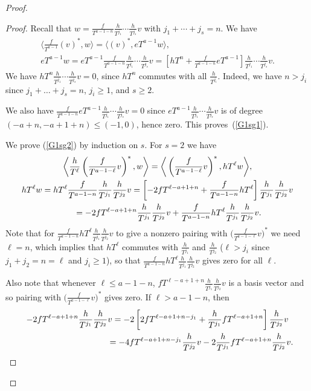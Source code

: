 \begin{proof}
\begin{proof}Recall that $w=\frac{f}{T^{a-1-n}}\frac{h}{T^{j_1}} \cdots \frac{h}{T^{j_s}} v$ with $j_1+\cdots+j_s=n$. We have
\begin{gather*}
\bigg\langle \frac{f}{T^{a-1}} (v)^*, w \bigg\rangle = \big\langle (v)^*, eT^{a-1} w \big\rangle, \\
eT^{a-1} w = eT^{a-1} \frac{f}{T^{a-1-n}}\frac{h}{T^{j_1}} \cdots \frac{h}{T^{j_s}} v = \left[ hT^n + \frac{f}{T^{a-1-n}} eT^{a-1} \right] \frac{h}{T^{j_1}} \cdots \frac{h}{T^{j_s}} v.
\end{gather*}
We have $hT^n \frac{h}{T^{j_1}} \cdots \frac{h}{T^{j_s}} v=0$, since $hT^n$ commutes with all $\frac{h}{T^{j_i}}$. Indeed, we have $n > j_i$ since $j_1 + \dots + j_s = n$, $j_i \geq 1$, and $s \geq 2$.

We also have $\frac{f}{T^{a-1-n}} eT^{a-1} \frac{h}{T^{j_1}} \cdots \frac{h}{T^{j_s}} v=0$ since $eT^{a-1} \frac{h}{T^{j_1}} \cdots \frac{h}{T^{j_s}}v$ is of degree $(-a+n, -a+1+n) \leq (-1, 0)$, hence zero. This proves~(\ref{G1sg1}).

We prove (\ref{G1sg2}) by induction on $s$. For $s=2$ we have
\begin{gather*}
\bigg\langle \frac{h}{T^{\ell}} \left(\frac{f}{T^{a-1-\ell}}v\right)^*, w \bigg\rangle = \bigg\langle \left(\frac{f}{T^{a-1-\ell}}v\right)^*, hT^{\ell} w \bigg\rangle, \\
hT^{\ell} w = hT^{\ell} \frac{f}{T^{a-1-n}}\frac{h}{T^{j_1}} \frac{h}{T^{j_2}} v = \left[ -2 fT^{\ell-a+1+n} + \frac{f}{T^{a-1-n}} hT^{\ell} \right] \frac{h}{T^{j_1}} \frac{h}{T^{j_2}} v \\
\hphantom{hT^{\ell} w}{} = -2 fT^{\ell-a+1+n} \frac{h}{T^{j_1}} \frac{h}{T^{j_2}} v + \frac{f}{T^{a-1-n}} hT^{\ell} \frac{h}{T^{j_1}} \frac{h}{T^{j_2}} v.
\end{gather*}
Note that for $ \frac{f}{T^{a-1-n}} hT^{\ell} \frac{h}{T^{j_1}} \frac{h}{T^{j_2}} v $ to give a nonzero pairing with $\big(\frac{f}{T^{a-1-\ell}}v\big)^*$ we need $\ell=n$, which implies that $hT^{\ell}$ commutes with $\frac{h}{T^{j_1}}$ and $\frac{h}{T^{j_2}}$ ($\ell > j_i$ since $j_1+j_2 =n=\ell$ and $j_i \geq 1$), so that $ \frac{f}{T^{a-1-n}} hT^{\ell} \frac{h}{T^{j_1}} \frac{h}{T^{j_2}} v $ gives zero for all $\ell$.

Also note that whenever $\ell \leq a-1-n$, $fT^{\ell-a+1+n} \frac{h}{T^{j_1}} \frac{h}{T^{j_2}} v$ is a basis vector and so pairing with $\big(\frac{f}{T^{a-1-\ell}}v\big)^*$ gives zero. If $\ell > a-1-n$, then
\begin{gather}
-2 fT^{\ell-a+1+n} \frac{h}{T^{j_1}} \frac{h}{T^{j_2}} v = -2 \left[ 2 fT^{\ell-a+1+n-j_1} + \frac{h}{T^{j_1}} fT^{\ell-a+1+n} \right] \frac{h}{T^{j_2}} v \nonumber \\
\hphantom{-2 fT^{\ell-a+1+n} \frac{h}{T^{j_1}} \frac{h}{T^{j_2}} v}{} = -4 fT^{\ell-a+1+n-j_1} \frac{h}{T^{j_2}} v -2 \frac{h}{T^{j_1}} fT^{\ell-a+1+n} \frac{h}{T^{j_2}} v. \label{1 and 2}
\end{gather}


\end{proof}
\end{proof}
